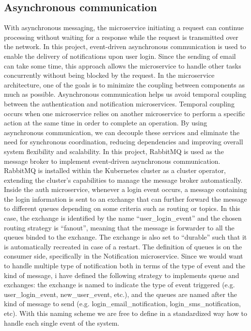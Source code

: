 \documentclass[manuscript,screen,review]{acmart}
\begin{document}
\subsection{Asynchronous communication}
With asynchronous messaging, the microservice initiating a request can continue processing without waiting for a response while the request is transmitted over the network. In this project, event-driven asynchronous communication is used to enable the delivery of notifications upon user login. Since the sending of email can take some time, this approach allows the microservice to handle other tasks concurrently without being blocked by the request.
In the microservice architecture, one of the goals is to minimize the coupling between components as much as possible. Asynchronous communication helps us avoid temporal coupling between the authentication and notification microservices. Temporal coupling occurs when one microservice relies on another microservice to perform a specific action at the same time in order to complete an operation. By using asynchronous communication, we can decouple these services and eliminate the need for synchronous coordination, reducing dependencies and improving overall system flexibility and scalability.
In this project, RabbitMQ is used as the message broker to implement event-driven asynchronous communication. RabbitMQ is installed within the Kubernetes cluster as a cluster operator, extending the cluster's capabilities to manage the message broker automatically.
Inside the auth microservice, whenever a login event occurs, a message containing the login information is sent to an exchange that can further forward the message to different queues depending on some criteria such as routing or topics. In this case, the exchange is identified by the name “user\_login\_event” and the chosen routing strategy is “fanout”, meaning that the message is forwarder to all the queues binded to the exchange. The exchange is also set to “durable” such that it is automatically recreated in case of a restart. 
The definition of queues is on the consumer side, specifically in the Notification microservice. 
Since we would want to handle multiple type of notification both in terms of the type of event and the kind of message, i have defined the following strategy to implements queue and exchanges: the exchange is named to indicate the type of event triggered (e.g. user\_login\_event, new\_user\_event, etc.), and the queues are named after the kind of message to send (e.g. login\_email\_notification, login\_sms\_notification, etc). With this naming scheme we are free to define in a standardized way how to handle each single event of the system.
\end{document}
